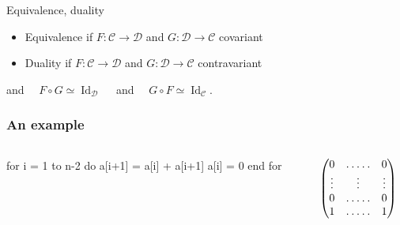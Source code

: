 \documentclass[10pt,handout]{beamer}
\newcommand{\cat}[1]{\mathscr{#1}}
\newcommand{\C}{\cat{C}}
\newcommand{\D}{\cat{D}}
\newcommand{\comp}{\circ}
\DeclareMathOperator{\Id}{Id}
\newcommand{\ra}{\rightarrow}
\begin{document}
\begin{frame}
  \begin{block}{Equivalence, duality}
    \begin{itemize}
    \item Equivalence if $F:\C\ra\D$ and $G:\D\ra\C$ covariant
    \item Duality if $F:\C\ra\D$ and $G:\D\ra\C$ contravariant 
    \end{itemize}
    and $\quad F\comp G \simeq \Id_\D\quad$ and $\quad G\comp F \simeq \Id_\C$.
  \end{block}
  
\end{frame}


\begin{frame}[fragile]
  \frametitle{An example}

  \Large

  \begin{columns}

    \begin{column}{0.6\textwidth}
      \begin{center}
        \begin{minipage}{0.9\textwidth}
\begin{semiverbatim}
  for i = 1 to n-2 do
    a[i+1] = a[i] + a[i+1]
    a[i] = 0
  end for
\end{semiverbatim}
        \end{minipage}
      \end{center}
    \end{column}

    \begin{column}{0.4\textwidth}

      \begin{equation*}
        \begin{pmatrix}
          0 & \hdotsfor{3} & 0\\
          \vdots  &  &\vdots&& \vdots \\
          0 & \hdotsfor{3} & 0\\
          1 & \hdotsfor{3} & 1
        \end{pmatrix}
      \end{equation*}

    \end{column}
  \end{columns}
\end{frame}
\end{document}

